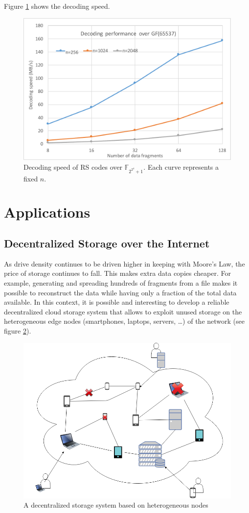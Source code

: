\documentclass[oneside,9pt]{article}
\newcommand{\gf}[2][]{ \mathbb{F}_{{#2}^{#1}} }
\begin{document}
Figure \ref{fig:dec_fnt_k_n} shows the decoding speed.

\begin{figure}[!ht]
\centering
\includegraphics[width=0.7\columnwidth]{dec_fnt_k_n.pdf}
\caption{Decoding speed of RS codes over $\gf{2^{2^4}+1}$. Each curve represents a fixed $n$.}
\label{fig:dec_fnt_k_n}
\end{figure}

\section{Applications}

\subsection{Decentralized Storage over the Internet}

As drive density continues to be driven higher in keeping with Moore's Law, the price of storage continues to fall. This makes extra data copies cheaper. For example, generating and spreading hundreds of fragments from a file makes it possible to reconstruct the data while having only a fraction of the total data available. In this context, it is possible and interesting to develop a reliable decentralized cloud storage system that allows to exploit unused storage on the heterogeneous edge nodes (smartphones, laptops, servers, \dots) of the network (see figure \ref{fig:network}).

\begin{figure}[!h]
\centering
\includegraphics[width=0.7\columnwidth]{network.png}
\caption{A decentralized storage system based on heterogeneous nodes}
\label{fig:network}
\end{figure}
\end{document}
